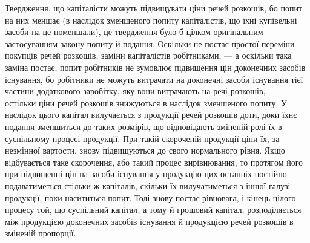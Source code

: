 Твердження, що капіталісти можуть підвищувати ціни речей розкошів,
бо попит на них меншає (в наслідок зменшеного попиту капіталістів, що
їхні купівельні засоби на це поменшали), це твердження було б цілком
оригінальним застосуванням закону попиту й подання. Оскільки не постає
простої переміни покупців речей розкошів, заміни капіталістів робітниками, —
а оскільки така заміна постає, попит робітників не зумовлює підвищення
цін доконечних засобів існування, бо робітники не можуть витрачати на
доконечні засоби існування тієї частини додаткового заробітку, яку вони
витрачають на речі розкошів, — остільки ціни речей розкошів знижуються
в наслідок зменшеного попиту. У наслідок цього капітал вилучається з
продукції речей розкошів доти, доки їхнє подання зменшиться до таких
розмірів, що відповідають зміненій ролі їх в суспільному процесі продукції.
При такій скороченій продукції ціни їх, за незмінної вартости, знову
підвищуються до свого нормального рівня. Якщо відбувається таке
скорочення, або такий процес вирівнювання, то протягом його при підвищенні
цін на засоби існування у продукцію цих останніх постійно
подаватиметься стільки ж капіталів, скільки їх вилучатиметься з іншої
галузі продукції, поки насититься попит. Тоді знову постає рівновага, і
кінець цілого процесу той, що суспільний капітал, а тому й грошовий
капітал, розподіляється між продукцією доконечних засобів існування й
продукцією речей розкошів в зміненій пропорції.
